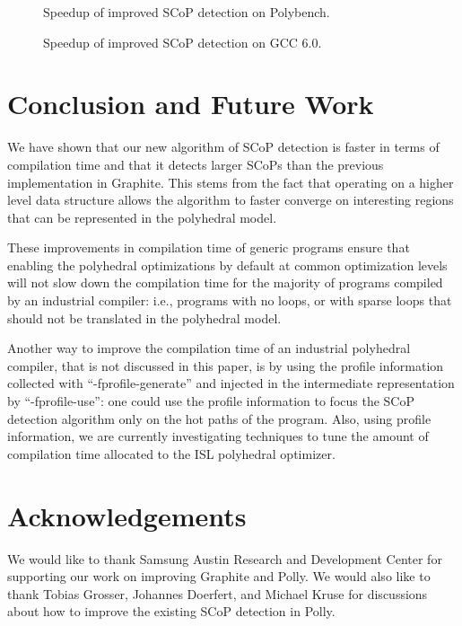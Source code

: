 \documentclass{sig-alternate}
\begin{document}
\begin {figure}
  \begin{center}
    \resizebox{\linewidth}{!}{}
  \end{center}
  \caption{Speedup of improved SCoP detection on Polybench.}
  \label{fig:polybench-speedup}
\end {figure}

\begin {figure}
  \begin{center}
    \resizebox{\linewidth}{!}{}
  \end{center}
  \caption{Speedup of improved SCoP detection on GCC 6.0.}
  \label{fig:gcc-speedup}
\end {figure}

\section{Conclusion and Future Work}
We have shown that our new algorithm of SCoP detection is faster in terms of
compilation time and that it detects larger SCoPs than the previous
implementation in Graphite.  This stems from the fact that operating on a higher
level data structure allows the algorithm to faster converge on interesting
regions that can be represented in the polyhedral model.

These improvements in compilation time of generic programs ensure that enabling
the polyhedral optimizations by default at common optimization levels will not
slow down the compilation time for the majority of programs compiled by an
industrial compiler: i.e., programs with no loops, or with sparse loops that
should not be translated in the polyhedral model.

Another way to improve the compilation time of an industrial polyhedral
compiler, that is not discussed in this paper, is by using the profile
information collected with ``-fprofile-generate'' and injected in the
intermediate representation by ``-fprofile-use'': one could use the profile
information to focus the SCoP detection algorithm only on the hot paths of the
program.  Also, using profile information, we are currently investigating
techniques to tune the amount of compilation time allocated to the ISL
polyhedral optimizer.

\section{Acknowledgements}
We would like to thank Samsung Austin Research and Development Center for
supporting our work on improving Graphite and Polly.  We would also like to
thank Tobias Grosser, Johannes Doerfert, and Michael Kruse for discussions about
how to improve the existing SCoP detection in Polly.


{\small

}
\end{document}
